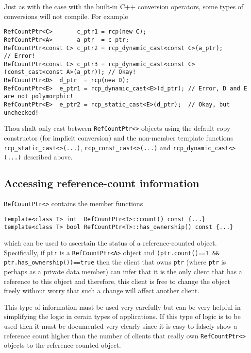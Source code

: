 %
Just as with the case with the built-in C++ conversion operators, some
types of conversions will not compile.  For example
%
{\scriptsize\begin{verbatim}
RefCountPtr<C>       c_ptr1 = rcp(new C);
RefCountPtr<A>       a_ptr  = c_ptr;
RefCountPtr<const C> c_ptr2 = rcp_dynamic_cast<const C>(a_ptr);                      // Error!
RefCountPtr<const C> c_ptr3 = rcp_dynamic_cast<const C>(const_cast<const A>(a_ptr)); // Okay!
RefCountPtr<D>  d_ptr  = rcp(new D);
RefCountPtr<E>  e_ptr1 = rcp_dynamic_cast<E>(d_ptr); // Error, D and E are not polymorphic!
RefCountPtr<E>  e_ptr2 = rcp_static_cast<E>(d_ptr);  // Okay, but unchecked!
\end{verbatim}}

\begin{commandment}
Thou shalt only cast between \texttt{RefCountPtr<>} objects using the
default copy constructor (for implicit conversion) and the non-member
template functions \texttt{rcp\-\_static\-\_cast<>(...)},
\texttt{rcp\-\_const\-\_cast<>(...)} and
\texttt{rcp\-\_dynamic\-\_cast<>(...)}  described above.
\end{commandment}

%
\subsection{Accessing reference-count information}
%

\texttt{RefCountPtr<>} contains the member functions
%
{\scriptsize\begin{verbatim}
template<class T> int  RefCountPtr<T>::count() const {...}
template<class T> bool RefCountPtr<T>::has_ownership() const {...}
\end{verbatim}}
%
\noindent{}which can be used to ascertain the status of a
reference-counted object.  Specifically, if \texttt{ptr} is a
\texttt{RefCountPtr<A>} object and \texttt{(ptr.count()==1 \&\&
ptr.has\_ownership())==true} then the client that owns \texttt{ptr}
(where \texttt{ptr} is perhaps as a private data member) can infer
that it is the only client that has a reference to this object and
therefore, this client is free to change the object freely without
worry that such a change will affect another client.

This type of information must be used very carefully but can be very
helpful in simplifying the logic in cerain types of applications. If
this type of logic is to be used then it must be documented very
clearly since it is easy to falsely show a reference count higher than
the number of clients that really own \texttt{RefCountPtr<>} objects to
the reference-counted object.


